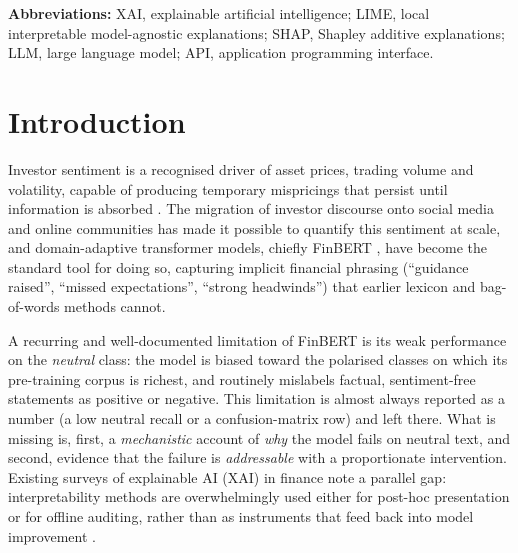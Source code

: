 \documentclass[12pt,a4paper]{article}
\begin{document}
\vspace{0.5em}
\noindent\textbf{Abbreviations:} XAI, explainable artificial intelligence; LIME,
local interpretable model-agnostic explanations; SHAP, Shapley additive
explanations; LLM, large language model; API, application programming interface.

\section{Introduction}
Investor sentiment is a recognised driver of asset prices, trading volume and
volatility, capable of producing temporary mispricings that persist until
information is absorbed \citep{tetlock2007,baker2006}. The migration of investor
discourse onto social media and online communities has made it possible to
quantify this sentiment at scale, and domain-adaptive transformer models, chiefly
FinBERT \citep{araci2019}, have become the standard tool for doing so, capturing
implicit financial phrasing (``guidance raised'', ``missed expectations'', ``strong
headwinds'') that earlier lexicon and bag-of-words methods cannot.

A recurring and well-documented limitation of FinBERT is its weak performance on
the \emph{neutral} class: the model is biased toward the polarised classes on
which its pre-training corpus is richest, and routinely mislabels factual,
sentiment-free statements as positive or negative. This limitation is almost
always reported as a number (a low neutral recall or a confusion-matrix row) and
left there. What is missing is, first, a \emph{mechanistic} account of \emph{why}
the model fails on neutral text, and second, evidence that the failure is
\emph{addressable} with a proportionate intervention. Existing surveys of
explainable AI (XAI) in finance note a parallel gap: interpretability methods are
overwhelmingly used either for post-hoc presentation or for offline auditing,
rather than as instruments that feed back into model improvement
\citep{yeo2025}.
\end{document}
